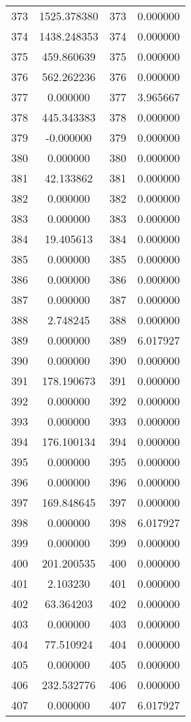 \documentclass[12pt]{article}
\begin{document}
\begin{longtable}{@{}cccc@{}}
373 & 1525.378380 & 373 & 0.000000 \\
374 & 1438.248353 & 374 & 0.000000 \\
375 & 459.860639 & 375 & 0.000000 \\
376 & 562.262236 & 376 & 0.000000 \\
377 & 0.000000 & 377 & 3.965667 \\
378 & 445.343383 & 378 & 0.000000 \\
379 & -0.000000 & 379 & 0.000000 \\
380 & 0.000000 & 380 & 0.000000 \\
381 & 42.133862 & 381 & 0.000000 \\
382 & 0.000000 & 382 & 0.000000 \\
383 & 0.000000 & 383 & 0.000000 \\
384 & 19.405613 & 384 & 0.000000 \\
385 & 0.000000 & 385 & 0.000000 \\
386 & 0.000000 & 386 & 0.000000 \\
387 & 0.000000 & 387 & 0.000000 \\
388 & 2.748245 & 388 & 0.000000 \\
389 & 0.000000 & 389 & 6.017927 \\
390 & 0.000000 & 390 & 0.000000 \\
391 & 178.190673 & 391 & 0.000000 \\
392 & 0.000000 & 392 & 0.000000 \\
393 & 0.000000 & 393 & 0.000000 \\
394 & 176.100134 & 394 & 0.000000 \\
395 & 0.000000 & 395 & 0.000000 \\
396 & 0.000000 & 396 & 0.000000 \\
397 & 169.848645 & 397 & 0.000000 \\
398 & 0.000000 & 398 & 6.017927 \\
399 & 0.000000 & 399 & 0.000000 \\
400 & 201.200535 & 400 & 0.000000 \\
401 & 2.103230 & 401 & 0.000000 \\
402 & 63.364203 & 402 & 0.000000 \\
403 & 0.000000 & 403 & 0.000000 \\
404 & 77.510924 & 404 & 0.000000 \\
405 & 0.000000 & 405 & 0.000000 \\
406 & 232.532776 & 406 & 0.000000 \\
407 & 0.000000 & 407 & 6.017927 \\

\end{longtable}
\end{document}
